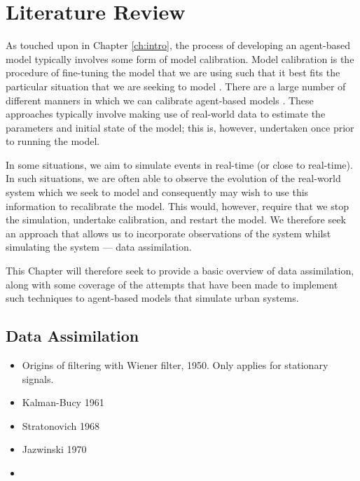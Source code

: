 \chapter{Literature Review}\label{ch:lit_rev}


As touched upon in Chapter \ref{ch:intro}, the process of developing an
agent-based model typically involves some form of model calibration.
Model calibration is the procedure of fine-tuning the model that we are using
such that it best fits the particular situation that we are seeking to model
\citep{crooks2012introduction}.
There are a large number of different manners in which we can calibrate
agent-based models \citep{thiele2014facilitating}.
These approaches typically involve making use of real-world data to estimate the
parameters and initial state of the model; this is, however, undertaken once
prior to running the model.

In some situations, we aim to simulate events in real-time (or close to
real-time).
In such situations, we are often able to observe the evolution of
the real-world system which we seek to model and consequently may wish to use
this information to recalibrate the model.
This would, however, require that we stop the simulation, undertake calibration,
and restart the model.
We therefore seek an approach that allows us to incorporate observations of the
system whilst simulating the system --- data assimilation.

This Chapter will therefore seek to provide a basic overview of data
assimilation, along with some coverage of the attempts that have been made to
implement such techniques to agent-based models that simulate urban systems.

\section{Data Assimilation}\label{sec:method:da}

\begin{itemize}
    \item Origins of filtering with Wiener filter, 1950. Only applies for
        stationary signals.
    \item Kalman-Bucy 1961
    \item Stratonovich 1968
    \item Jazwinski 1970
    \item 
\end{itemize}

